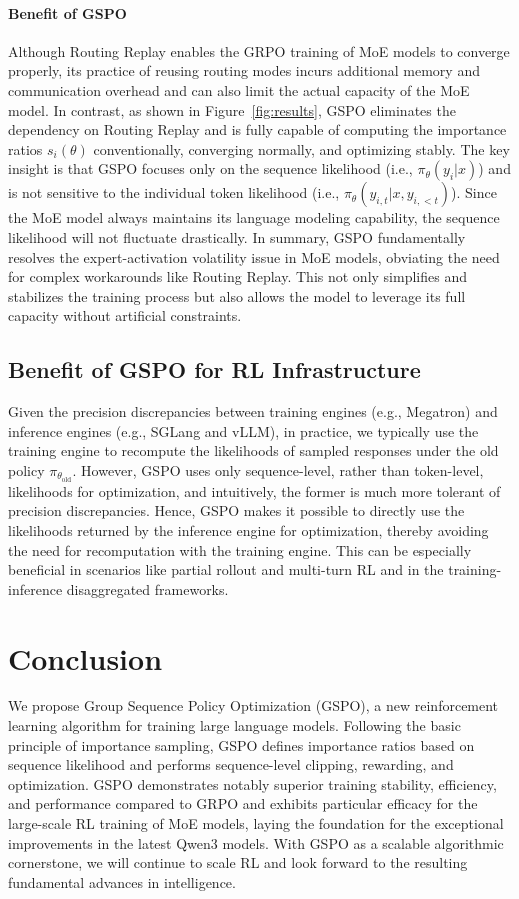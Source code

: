 \paragraph{Benefit of GSPO} Although Routing Replay enables the GRPO training of MoE models to converge properly, its practice of reusing routing modes incurs additional memory and communication overhead and can also limit the actual capacity of the MoE model. In contrast, as shown in Figure~\ref{fig:results}, GSPO eliminates the dependency on Routing Replay and is fully capable of computing the importance ratios $s_i(\theta)$ conventionally, converging normally, and optimizing stably. The key insight is that GSPO focuses only on the sequence likelihood (i.e., $\pi_{\theta} (y_i | x)$) and is not sensitive to the individual token likelihood (i.e., $\pi_{\theta} (y_{i,t} | x, y_{i,<t})$). Since the MoE model always maintains its language modeling capability, the sequence likelihood will not fluctuate drastically. In summary, GSPO fundamentally resolves the expert-activation volatility issue in MoE models, obviating the need for complex workarounds like Routing Replay. This not only simplifies and stabilizes the training process but also allows the model to leverage its full capacity without artificial constraints.

\subsection{Benefit of GSPO for RL Infrastructure}

Given the precision discrepancies between training engines (e.g., Megatron) and inference engines (e.g., SGLang and vLLM), in practice, we typically use the training engine to recompute the likelihoods of sampled responses under the old policy $\pi_{\theta_\text{old}}$.
However, GSPO uses only sequence-level, rather than token-level, likelihoods for optimization, and intuitively, the former is much more tolerant of precision discrepancies. Hence, GSPO makes it possible to directly use the likelihoods returned by the inference engine for optimization, thereby avoiding the need for recomputation with the training engine. This can be especially beneficial in scenarios like partial rollout and multi-turn RL and in the training-inference disaggregated frameworks.

\section{Conclusion}

We propose Group Sequence Policy Optimization (GSPO), a new reinforcement learning algorithm for training large language models. Following the basic principle of importance sampling, GSPO defines importance ratios based on sequence likelihood and performs sequence-level clipping, rewarding, and optimization. GSPO demonstrates notably superior training stability, efficiency, and performance compared to GRPO and exhibits particular efficacy for the large-scale RL training of MoE models, laying the foundation for the exceptional improvements in the latest Qwen3 models. With GSPO as a scalable algorithmic cornerstone, we will continue to scale RL and look forward to the resulting fundamental advances in intelligence.

